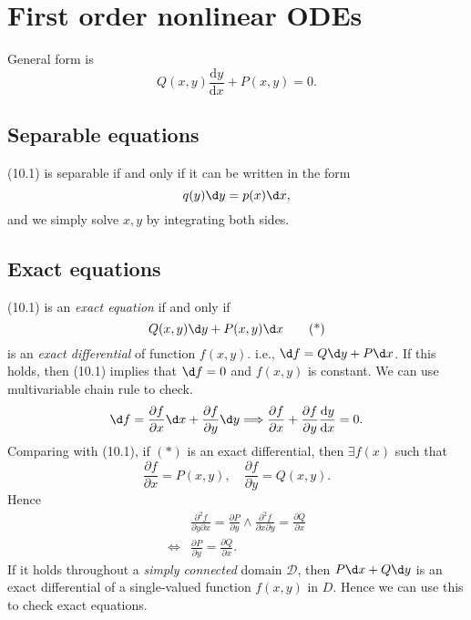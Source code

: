 \documentclass[a4paper]{article}
\begin{document}
    \section{First order nonlinear ODEs}
    General form is 
    \begin{equation}
        Q(x,y)\frac{\mathrm{d}y}{\mathrm{d}x}+P(x,y)=0.
    \end{equation}
    \subsection{Separable equations}
    (10.1) is separable if and only if it can be written in the form 
    \[
        q(y)\d y=p(x)\d x,
    \]
    and we simply solve $x,y$ by integrating both sides.
    \subsection{Exact equations}
    (10.1) is an \textit{exact equation} if and only if 
    \[
        Q(x,y)\d y+P(x,y)\d x\tag{*}
    \]
    is an \textit{exact differential} of function $f(x,y)$. i.e., $ \d f= Q\d y+P\d x $. If this holds, then (10.1) implies that $ \d f=0 $ and $f(x,y)$ is constant. We can use multivariable chain rule to check.
    \[
        \d f=\frac{\partial f}{\partial x}\d x+ \frac{\partial f}{\partial y}\d y \Longrightarrow \frac{\partial f}{\partial x}+\frac{\partial f}{\partial y}\frac{\mathrm{d}y}{\mathrm{d}x}=0     
    .\]
    Comparing with (10.1), if $(*)$ is an exact differential, then $\exists f(x)$ such that 
    \[
        \frac{\partial f}{\partial x}=P(x,y),\quad \frac{\partial f}{\partial y}=Q(x,y)  \tag{**}
    .\]
    Hence 
    \[
        \begin{aligned}
             & \frac{\partial^2 f}{\partial y\partial x} =\frac{\partial P}{\partial y} \land  \frac{\partial^2 f}{\partial x\partial y} =\frac{\partial Q}{\partial x}\\
             \Longleftrightarrow & \boxed{\frac{\partial P}{\partial y}=\frac{\partial Q}{\partial x}}.
        \end{aligned}
    \]
    If it holds throughout a \textit{simply connected} domain $\mathcal{D}$, then $ P\d x+Q\d y $ is an exact differential of a single-valued function $f(x,y)$ in $D$. Hence we can use this to check exact equations.
\end{document}
